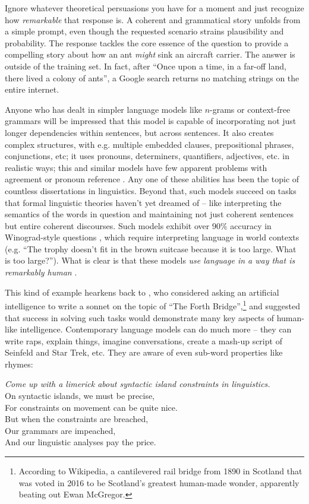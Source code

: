 \documentclass[output=paper,colorlinks,citecolor=brown]{langscibook}
\begin{document}
\noindent Ignore whatever theoretical persuasions you have for a moment and just recognize how \textit{remarkable} that response is. A coherent and grammatical story unfolds from a simple prompt, even though the requested scenario strains plausibility and probability. The response tackles the core essence of the question to provide a compelling story about how an ant \textit{might} sink an aircraft carrier. The answer is outside of the training set. In fact, after ``Once upon a time, in a far-off land, there lived a colony of ants'', a Google search returns no matching strings on the entire internet.

Anyone who has dealt in simpler language models like $n$-grams or context-free grammars will be impressed that this model is capable of incorporating not just longer dependencies within sentences, but across sentences. It also creates complex structures, with e.g. multiple embedded clauses, prepositional phrases, conjunctions, etc; it uses pronouns, determiners, quantifiers, adjectives, etc. in realistic ways; this and similar models have few apparent problems with agreement or pronoun reference \citep{gulordava2018colorless,goldberg2019assessing}. Any one of these abilities has been the topic of countless dissertations in linguistics. Beyond that, such models succeed on tasks that formal linguistic theories haven't yet dreamed of -- like interpreting the semantics of the words in question and maintaining not just coherent sentences but entire coherent discourses. Such models exhibit over $90\%$ accuracy in Winograd-style questions \citep{kocijan2020review,kocijan2022defeat}, which require interpreting language in world contexts (e.g. ``The trophy doesn’t fit in the brown suitcase because it is too large. What is too large?''). What is clear is that these models \textit{use language in a way that is remarkably human} \citep{mahowald2023dissociating}. 


This kind of example hearkens back to \citet{turing1950computing}, who considered asking an artificial intelligence to write a sonnet on the topic of ``The Forth Bridge'',\footnote{ According to Wikipedia, a cantilevered rail bridge from 1890 in Scotland that was voted in 2016 to be Scotland's greatest human-made wonder, apparently beating out Ewan McGregor.} and suggested that success in solving such tasks would demonstrate many key aspects of human-like intelligence. Contemporary language models can do much more -- they can write raps, explain things, imagine conversations, create a mash-up script of Seinfeld and Star Trek, etc. They are aware of even sub-word properties like rhymes:
\begin{myquote}
\textit{Come up with a limerick about syntactic island constraints in linguistics.}\medskip\\
\noindent On syntactic islands, we must be precise,\\
For constraints on movement can be quite nice.\\
But when the constraints are breached,\\
Our grammars are impeached,\\
And our linguistic analyses pay the price.
\end{myquote}
\end{document}
